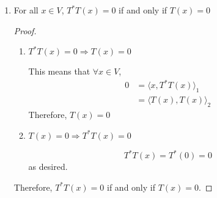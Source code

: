 \documentclass[11pt]{scrartcl}
\begin{document}
\begin{enumerate}[label=\alph*.]
{\begin{proof}
		      \begin{align*}
			      \langle T^*(x), y \rangle_1 & = \overline{\langle y, T^*(x) \rangle_1} \\
			                                  & = \overline{\langle T(y), x \rangle_2}   \\
			                                  & = \langle x, T(y) \rangle_2
		      \end{align*}
		      as desired.
	      \end{proof}
	      }
	\item{
	      For all $x \in V$, $T^*T(x) = 0$ if and only if $T(x)=0$
	      \begin{proof}\
		      \begin{enumerate}[label=\roman*.]
			      \item {
			            $T^*T(x) = 0 \Rightarrow T(x)=0$\par
			            This means that $\forall x \in V$,
			            \begin{align*}
				            0 & = \langle x, T^*T(x) \rangle_1 \\
				              & =\langle T(x), T(x) \rangle_2
			            \end{align*}
			            Therefore, $T(x)=0$
			            }
			      \item {
			            $T(x)=0 \Rightarrow T^*T(x) = 0 $\par
			            $$T^*T(x) = T^*(0) = 0$$
			            as desired.
			            }
		      \end{enumerate}
		      Therefore, $T^*T(x) = 0$ if and only if $T(x)=0$.
	      \end{proof}
	      }
\end{enumerate}

\end{document}
